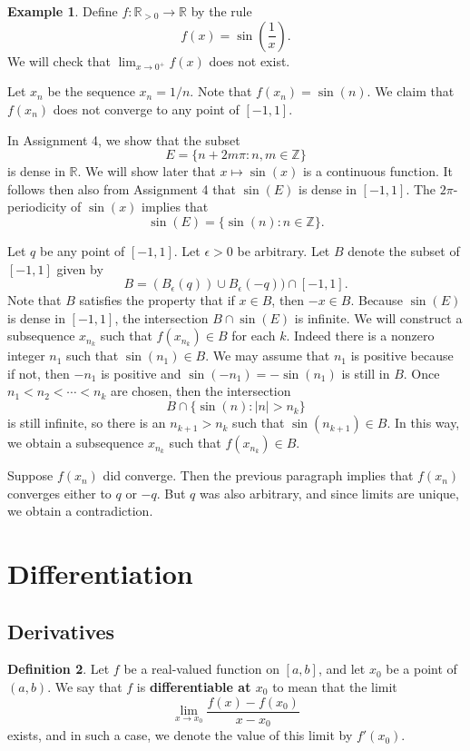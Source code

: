 \documentclass[12pt]{article}
\theoremstyle{definition}
\newtheorem{definition}{Definition}
\newtheorem{example}[definition]{Example}
\theoremstyle{theorem}
\begin{document}
\begin{example}
Define $f : \mathbb{R}_{>0} \to \mathbb{R}$ by the rule 
\[
f(x) = \sin\left(\frac{1}{x}\right).
\]
We will check that $\lim_{x \to 0^+} f(x)$ does not exist. 

Let $x_n$ be the sequence $x_n = 1/n$. Note that $f(x_n) = \sin(n)$. We claim that $f(x_n)$ does not converge to any point of $[-1,1]$.  

In Assignment 4, we show that the subset 
\[
E = \{n + 2m \pi : n, m \in \mathbb{Z}\}
\]
is dense in $\mathbb{R}$. We will show later that $x \mapsto \sin(x)$ is a continuous function. It follows then also from Assignment 4 that $\sin(E)$ is dense in $[-1,1]$. The $2\pi$-periodicity of $\sin(x)$ implies that  
\[
\sin(E) = \{\sin(n) : n \in \mathbb{Z}\}.
\]

Let $q$ be any point of $[-1,1]$. Let $\epsilon > 0$ be arbitrary. Let $B$ denote the subset of $[-1,1]$ given by 
\[
B = (B_\epsilon(q)) \cup B_{\epsilon}(-q)) \cap [-1,1].
\]
Note that $B$ satisfies the property that if $x \in B$, then $-x \in B$. Because $\sin(E)$ is dense in $[-1,1]$, the intersection $B \cap \sin(E)$ is infinite. We will construct a subsequence $x_{n_k}$ such that $f(x_{n_k}) \in B$ for each $k$. Indeed there is a nonzero integer $n_1$ such that $\sin(n_1) \in B$. We may assume that $n_1$ is positive because if not, then $-n_1$ is positive and $\sin(-n_1) = - \sin(n_1)$ is still in $B$. Once $n_1 < n_2 < \cdots < n_k$ are chosen, then the intersection 
\[
B \cap \{ \sin(n) : |n| > n_k\}
\] 
is still infinite, so there is an $n_{k+1} > n_k$ such that $\sin(n_{k+1}) \in B$. In this way, we obtain a subsequence $x_{n_k}$ such that $f(x_{n_k}) \in B$.

Suppose $f(x_n)$ did converge. Then the previous paragraph implies that $f(x_n)$ converges either to $q$ or $-q$. But $q$ was also arbitrary, and since limits are unique, we obtain a contradiction. 
\end{example}



\section{Differentiation}

\subsection{Derivatives}



\begin{definition}
Let $f$ be a real-valued function on $[a,b]$, and let $x_0$ be a point of $(a,b)$. We say that $f$ is \textbf{differentiable at $x_0$} to mean that the limit 
\[
\lim_{x \to x_0} \frac{f(x) - f(x_0)}{x - x_0}
\]
exists, and in such a case, we denote the value of this limit by $f'(x_0)$. 
\end{definition}
\end{document}
